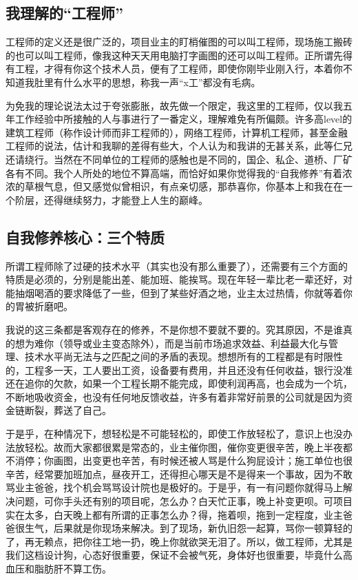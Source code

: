 \documentclass[]{book}
\begin{document}
\hypertarget{ux6211ux7406ux89e3ux7684ux5de5ux7a0bux5e08}{%
\subsection{我理解的``工程师''}\label{ux6211ux7406ux89e3ux7684ux5de5ux7a0bux5e08}}

工程师的定义还是很广泛的，项目业主的盯梢催图的可以叫工程师，现场施工搬砖的也可以叫工程师，像我这种天天用电脑打字画图的还可以叫工程师。正所谓先得有工程，才得有你这个技术人员，便有了工程师，即使你刚毕业刚入行，本着你不知道我肚里有什么水平的思想，称我一声``x工''都没有毛病。

为免我的理论说法太过于夸张膨胀，故先做一个限定，我这里的工程师，仅以我五年工作经验中所接触的人与事进行了一番定义，理解难免有所偏颇。许多高level的建筑工程师（称作设计师而非工程师的），网络工程师，计算机工程师，甚至金融工程师的说法，估计和我聊的差得有些大，个人认为和我讲的无甚关系，此等仁兄还请绕行。当然在不同单位的工程师的感触也是不同的，国企、私企、道桥、厂矿各有不同。我个人所处的地位不算高端，而恰好如果你觉得我的``自我修养''有着浓浓的草根气息，但又感觉似曾相识，有点亲切感，那恭喜你，你基本上和我在在一个阶层，还得继续努力，才能登上人生的巅峰。

\hypertarget{ux81eaux6211ux4feeux517bux6838ux5fc3ux4e09ux4e2aux7279ux8d28}{%
\subsection{自我修养核心：三个特质}\label{ux81eaux6211ux4feeux517bux6838ux5fc3ux4e09ux4e2aux7279ux8d28}}

所谓工程师除了过硬的技术水平（其实也没有那么重要了），还需要有三个方面的特质是必须的，分别是能出差、能加班、能挨骂。现在年轻一辈比老一辈还好，对能抽烟喝酒的要求降低了一些，但到了某些好酒之地，业主太过热情，你就等着你的胃被折磨吧。

我说的这三条都是客观存在的修养，不是你想不要就不要的。究其原因，不是谁真的想为难你（领导或业主变态除外），而是当前市场追求效益、利益最大化与管理、技术水平尚无法与之匹配之间的矛盾的表现。想想所有的工程都是有时限性的，工程多一天，工人要出工资，设备要有费用，并且还没有任何收益，银行没准还在追你的欠款，如果一个工程长期不能完成，即使利润再高，也会成为一个坑，不断地吸收资金，也没有任何地反馈收益，许多有着非常好前景的公司就是因为资金链断裂，葬送了自己。

于是乎，在种情况下，想轻松是不可能轻松的，即使工作放轻松了，意识上也没办法放轻松。故而大家都很累是常态的，业主催你图，催你变更很辛苦，晚上半夜都不消停；你画图，出变更也辛苦，有时候还被人骂是什么狗屁设计；施工单位也很辛苦，经常要加班加点，昼夜开工，还得担心哪天是不是得来一个事故，因为不敢骂业主爸爸，找个机会骂骂设计院也是极好的。于是乎，有一有问题你就得马上解决问题，可你手头还有别的项目呢，怎么办？白天忙正事，晚上补变更呗。可项目实在太多，白天晚上都有所谓的正事怎么办？得，拖着呗，拖到一定程度，业主爸爸很生气，后果就是你现场来解决。到了现场，新仇旧怨一起算，骂你一顿算轻的了，再无赖点，把你往工地一扔，晚上你就欲哭无泪了。所以，做工程师，尤其是我们这档设计狗，心态好很重要，保证不会被气死，身体好也很重要，毕竟什么高血压和脂肪肝不算工伤。
\end{document}
